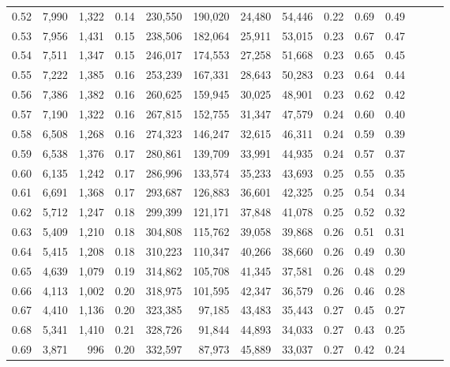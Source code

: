 \begin{tabular}{rrrrrrrrrrrrrr}
0.52 &   7,990 &  1,322 &  0.14 &  230,550 &  190,020 &  24,480 &  54,446 &  0.22 &  0.69 &      0.49 \\
0.53 &   7,956 &  1,431 &  0.15 &  238,506 &  182,064 &  25,911 &  53,015 &  0.23 &  0.67 &      0.47 \\
0.54 &   7,511 &  1,347 &  0.15 &  246,017 &  174,553 &  27,258 &  51,668 &  0.23 &  0.65 &      0.45 \\
0.55 &   7,222 &  1,385 &  0.16 &  253,239 &  167,331 &  28,643 &  50,283 &  0.23 &  0.64 &      0.44 \\
0.56 &   7,386 &  1,382 &  0.16 &  260,625 &  159,945 &  30,025 &  48,901 &  0.23 &  0.62 &      0.42 \\
0.57 &   7,190 &  1,322 &  0.16 &  267,815 &  152,755 &  31,347 &  47,579 &  0.24 &  0.60 &      0.40 \\
0.58 &   6,508 &  1,268 &  0.16 &  274,323 &  146,247 &  32,615 &  46,311 &  0.24 &  0.59 &      0.39 \\
0.59 &   6,538 &  1,376 &  0.17 &  280,861 &  139,709 &  33,991 &  44,935 &  0.24 &  0.57 &      0.37 \\
0.60 &   6,135 &  1,242 &  0.17 &  286,996 &  133,574 &  35,233 &  43,693 &  0.25 &  0.55 &      0.35 \\
0.61 &   6,691 &  1,368 &  0.17 &  293,687 &  126,883 &  36,601 &  42,325 &  0.25 &  0.54 &      0.34 \\
0.62 &   5,712 &  1,247 &  0.18 &  299,399 &  121,171 &  37,848 &  41,078 &  0.25 &  0.52 &      0.32 \\
0.63 &   5,409 &  1,210 &  0.18 &  304,808 &  115,762 &  39,058 &  39,868 &  0.26 &  0.51 &      0.31 \\
0.64 &   5,415 &  1,208 &  0.18 &  310,223 &  110,347 &  40,266 &  38,660 &  0.26 &  0.49 &      0.30 \\
0.65 &   4,639 &  1,079 &  0.19 &  314,862 &  105,708 &  41,345 &  37,581 &  0.26 &  0.48 &      0.29 \\
0.66 &   4,113 &  1,002 &  0.20 &  318,975 &  101,595 &  42,347 &  36,579 &  0.26 &  0.46 &      0.28 \\
0.67 &   4,410 &  1,136 &  0.20 &  323,385 &   97,185 &  43,483 &  35,443 &  0.27 &  0.45 &      0.27 \\
0.68 &   5,341 &  1,410 &  0.21 &  328,726 &   91,844 &  44,893 &  34,033 &  0.27 &  0.43 &      0.25 \\
0.69 &   3,871 &    996 &  0.20 &  332,597 &   87,973 &  45,889 &  33,037 &  0.27 &  0.42 &      0.24 \\

\end{tabular}
